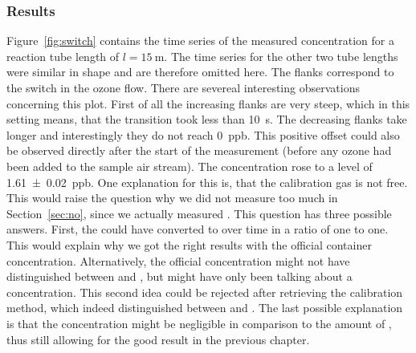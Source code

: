 \subsubsection{Results}
\label{sec:switch-results}

Figure~\ref{fig:switch} contains the time series of the measured
 concentration for a reaction tube length of $l =
\SI{15}{\meter}$. The time series for the other two tube lengths were
similar in shape and are therefore omitted here. The flanks correspond
to the switch in the ozone flow. There are severeal interesting
observations concerning this plot. First of all the increasing flanks
are very steep, which in this setting means, that the transition took
less than \SI{10}{\second}. The decreasing flanks take longer and
interestingly they do not reach \SI{0}{ppb}. This positive offset
could also be observed directly after the start of the measurement
(before any ozone had been added to the 
sample air stream). The concentration rose to a level of
\SI{1.61(2)}{ppb}. One explanation for this is, that the calibration gas is
not  free. This would raise the question why we did not
measure too much  in Section~\ref{sec:no}, since we actually
measured . This question has three possible answers. First, the
 could have converted to  over time in a ratio of
one to one. This would explain why we got the right results with the official
container concentration. Alternatively, the official concentration
might not have distinguished between  and , but might
have only been talking about a  concentration. This second
idea could be rejected after retrieving the calibration method, which
indeed distinguished between  and . The last possible
explanation is that the  concentration might be negligible in
comparison to the amount of , thus still allowing for the good
result in the previous chapter.

